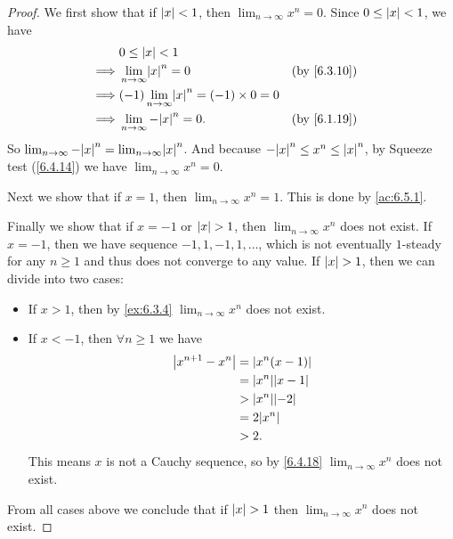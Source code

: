 \begin{proof}
  We first show that if \(\left\lvert x\right\rvert < 1\), then \(\lim_{n \to \infty} x^n = 0\).
  Since \(0 \leq \left\lvert x\right\rvert < 1\), we have
  \begin{align*}
             & 0 \leq \abs{x} < 1                                                                   \\
    \implies & \lim_{n \to \infty} \abs{x}^n = 0                     &  & \text{(by \cref{6.3.10})} \\
    \implies & (-1)\lim_{n \to \infty} \abs{x}^n = (-1) \times 0 = 0                                \\
    \implies & \lim_{n \to \infty} -\abs{x}^n = 0.                   &  & \text{(by \cref{6.1.19})}
  \end{align*}
  So \(\lim_{n \to \infty} -\abs{x}^n = \lim_{n \to \infty} \abs{x}^n\).
  And because \(-\abs{x}^n \leq x^n \leq \abs{x}^n\), by Squeeze test (\cref{6.4.14}) we have \(\lim_{n \to \infty} x^n = 0\).

  Next we show that if \(x = 1\), then \(\lim_{n \to \infty} x^n = 1\).
  This is done by \cref{ac:6.5.1}.

  Finally we show that if \(x = -1\) or \(\left\lvert x\right\rvert > 1\), then \(\lim_{n \to \infty} x^n\) does not exist.
  If \(x = -1\), then we have sequence \(-1, 1, -1, 1, \dots\), which is not eventually \(1\)-steady for any \(n \geq 1\) and thus does not converge to any value.
  If \(\left\lvert x\right\rvert > 1\), then we can divide into two cases:
  \begin{itemize}
    \item If \(x > 1\), then by \cref{ex:6.3.4} \(\lim_{n \to \infty} x^n\) does not exist.
    \item If \(x < -1\), then \(\forall n \geq 1\) we have
          \begin{align*}
            \abs{x^{n + 1} - x^n} & = \abs{x^n(x - 1)}     \\
                                  & = \abs{x^n}\abs{x - 1} \\
                                  & > \abs{x^n}\abs{-2}    \\
                                  & = 2\abs{x^n}           \\
                                  & > 2.
          \end{align*}
          This means \(x\) is not a Cauchy sequence, so by \cref{6.4.18} \(\lim_{n \to \infty} x^n\) does not exist.
  \end{itemize}
  From all cases above we conclude that if \(\left\lvert x\right\rvert > 1\) then \(\lim_{n \to \infty} x^n\) does not exist.
\end{proof}

